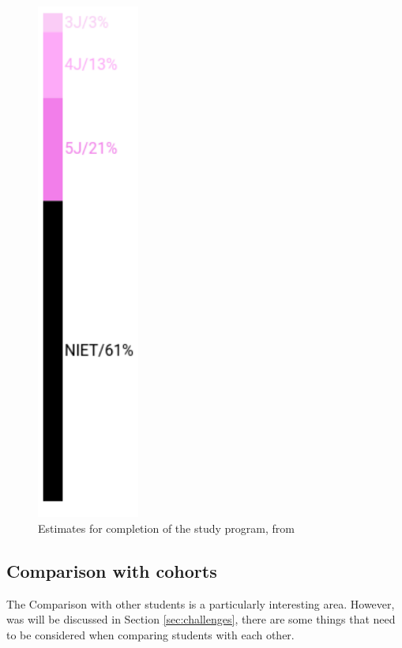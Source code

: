 \begin{figure}
\begin{minipage}[b]{0.48\textwidth}
        \hfill
        \includegraphics[width=0.3\textwidth]{figures/trajectory-finish_2.png}
        \caption{Estimates for completion of the study program, from \cite{LISSA}}
        \label{fig:trajectory-finish_1.png}
    \end{minipage}
\end{figure}

\subsection{Comparison with cohorts}
\label{subsec:comparison}

The Comparison with other students is a particularly interesting area. However, was will be discussed in Section \ref{sec:challenges}, there are some things that need to be considered when comparing students with each other.

